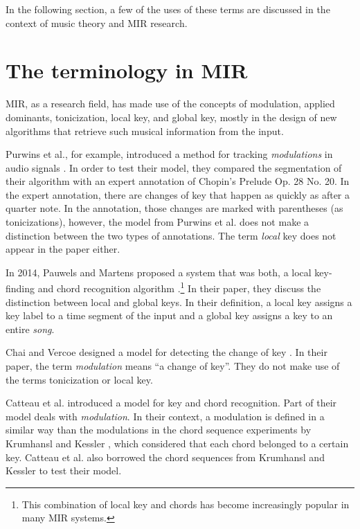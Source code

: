 In the following section, a few of the uses of these terms are discussed in the context of music theory and MIR research.

\section{The terminology in MIR}
MIR, as a research field, has made use of the concepts of modulation, applied dominants, tonicization, local key, and global key, mostly in the design of new algorithms that retrieve such musical information from the input.

Purwins et al., for example, introduced a method for tracking \emph{modulations} in audio signals \cite{purwins_new_2000}. In order to test their model, they compared the segmentation of their algorithm with an expert annotation of Chopin's Prelude Op. 28 No. 20. In the expert annotation, there are changes of key that happen as quickly as after a quarter note. In the annotation, those changes are marked with parentheses (as tonicizations), however, the model from Purwins et al. does not make a distinction between the two types of annotations. The term \emph{local} key does not appear in the paper either.

In 2014, Pauwels and Martens proposed a system that was both, a local key-finding and chord recognition algorithm \cite{pauwels_combining_2014}.\footnote{This combination of local key and chords has become increasingly popular in many MIR systems.} In their paper, they discuss the distinction between local and global keys. In their definition, a local key assigns a key label to a time segment of the input and a global key assigns a key to an entire \emph{song}.

Chai and Vercoe designed a model for detecting the change of key \cite{chai_detection_2005}. In their paper, the term \emph{modulation} means ``a change of key''. They do not make use of the terms tonicization or local key.

Catteau et al. introduced a model for key and chord recognition. Part of their model deals with \emph{modulation}. In their context, a modulation is defined in a similar way than the modulations in the chord sequence experiments by Krumhansl and Kessler \cite{krumhansl_tracing_1982}, which considered that each chord belonged to a certain key. Catteau et al. also borrowed the chord sequences from Krumhansl and Kessler to test their model.

